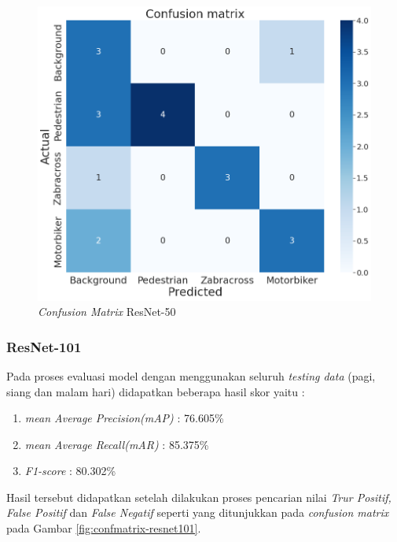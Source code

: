 \begin{figure}[!h]
	\centering
	\includegraphics[scale=0.3]{gambar/confmatrix/all-resnet50-blue.png}
	\caption{\textit{Confusion Matrix} ResNet-50}
	\label{fig:confmatrix-resnet50}
\end{figure}

\subsubsection{ResNet-101}

Pada proses evaluasi model dengan menggunakan seluruh \textit{testing data} (pagi, siang dan malam hari) didapatkan beberapa hasil skor yaitu :
\begin{enumerate}[nolistsep]
	\item \textit{mean Average Precision(mAP)} : 76.605\%
	\item \textit{mean Average Recall(mAR)} : 85.375\%
	\item \textit{F1-score} : 80.302\%
\end{enumerate}
Hasil tersebut didapatkan setelah dilakukan proses pencarian nilai \textit{Trur Positif, False Positif} dan \textit{False Negatif} seperti yang ditunjukkan pada \textit{confusion matrix} pada Gambar \ref{fig:confmatrix-resnet101}.

